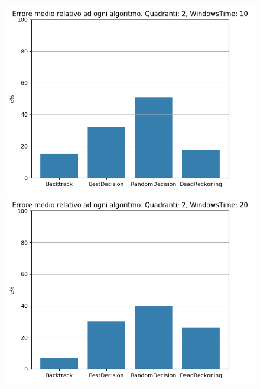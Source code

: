 \documentclass[12pt,a4paper,openright,twoside]{report}
\begin{document}
\begin{figure}[H]
\centering  
\includegraphics[scale=0.4]{secondChart2-10} 
\includegraphics[scale=0.4]{secondChart2-20} 
\end{figure}
\end{document}
